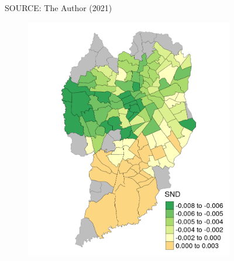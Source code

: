 \begin{figure}[!htbp]
\begin{subfigure}{0.5\textwidth}
    \end{subfigure}    
    \label{fig:gwr_pd}
    \par SOURCE: The Author (2021)
\end{figure}

\begin{figure}[!htbp]
    \centering\footnotesize
    \captionsetup{font=footnotesize}
    \caption{SND COEFFICIENT ESTIMATES}
    \begin{subfigure}{0.5\textwidth}
        \includegraphics{fig/SND.png}
    \end{subfigure}%
    \begin{subfigure}{0.5\textwidth}

\end{subfigure}
\end{figure}
